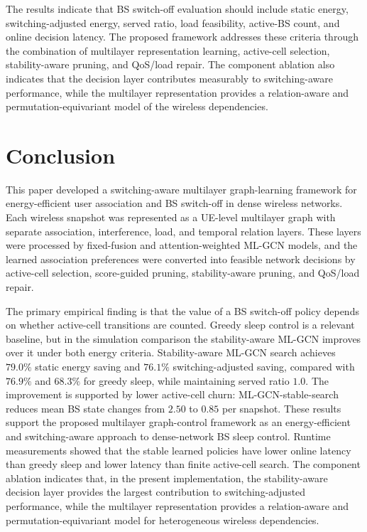 \documentclass[journal]{IEEEtran}
\begin{document}
The results indicate that BS switch-off evaluation should include static
energy, switching-adjusted energy, served ratio, load feasibility, active-BS
count, and online decision latency. The proposed framework addresses these
criteria through the combination of multilayer representation learning,
active-cell selection, stability-aware pruning, and QoS/load repair. The
component ablation also indicates that the decision layer contributes
measurably to switching-aware performance, while the multilayer
representation provides a relation-aware and permutation-equivariant model of
the wireless dependencies.

\section{Conclusion}
This paper developed a switching-aware multilayer graph-learning framework for
energy-efficient user association and BS switch-off in dense wireless networks.
Each wireless snapshot was represented as a UE-level multilayer graph with
separate association, interference, load, and temporal relation layers. These
layers were processed by fixed-fusion and attention-weighted ML-GCN models,
and the learned association preferences were converted into feasible network
decisions by active-cell selection, score-guided pruning, stability-aware
pruning, and QoS/load repair.

The primary empirical finding is that the value of a BS switch-off policy depends on
whether active-cell transitions are counted. Greedy sleep control is a relevant
baseline, but in the simulation comparison the stability-aware ML-GCN improves
over it under both energy criteria. Stability-aware ML-GCN search achieves
$79.0\%$ static energy saving and $76.1\%$ switching-adjusted saving, compared
with $76.9\%$ and $68.3\%$ for greedy sleep, while maintaining served ratio
$1.0$. The improvement is supported by lower active-cell churn:
ML-GCN-stable-search reduces mean BS state changes from $2.50$ to $0.85$ per
snapshot. These results support
the proposed multilayer graph-control framework as an energy-efficient and
switching-aware approach to dense-network BS sleep control. Runtime
measurements showed that the stable learned policies have lower online latency
than greedy sleep and lower latency than finite active-cell
search. The component ablation indicates that, in the present implementation,
the stability-aware decision layer provides the largest contribution to
switching-adjusted performance, while the multilayer representation provides a
relation-aware and permutation-equivariant model for heterogeneous wireless
dependencies.
\end{document}
